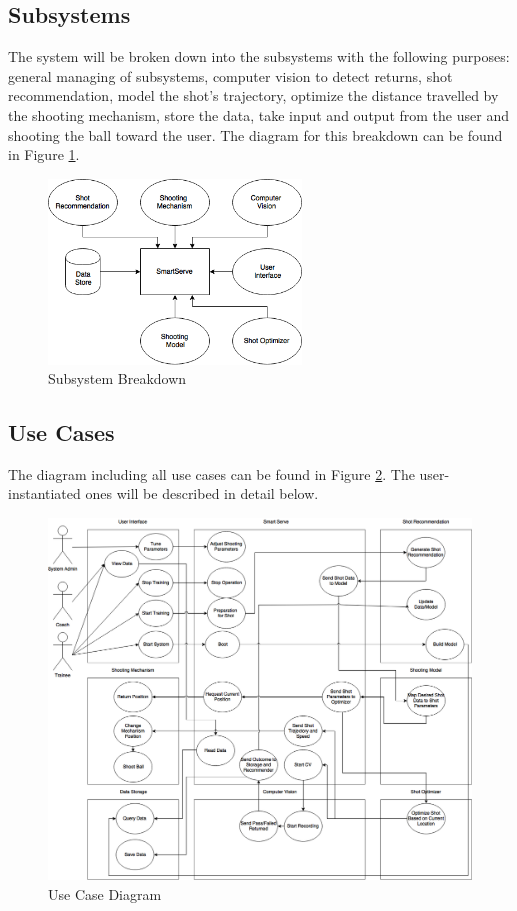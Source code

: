 \documentclass[11pt]{article}
\begin{document}
\subsection{Subsystems}
The system will be broken down into the subsystems with the following purposes: general managing of subsystems, computer vision to detect returns, shot recommendation, model the shot's trajectory, optimize the distance travelled by the shooting mechanism, store the data, take input and output from the user and shooting the ball toward the user. The diagram for this breakdown can be found in Figure \ref{fig:sub}.
\begin{figure}[H]
   \centering
   \includegraphics[width=0.6\textwidth]{img/Subsystem.png} %
   \caption{Subsystem Breakdown}
   \label{fig:sub}
\end{figure}
\subsection{Use Cases}
The diagram including all use cases can be found in Figure \ref{fig:usecase}. The user-instantiated ones will be described in detail below.
\begin{figure}[htbp]
   \centering
   \includegraphics[width=\textwidth]{img/UseCase.png} %
   \caption{Use Case Diagram}
   \label{fig:usecase}
\end{figure}
\end{document}
